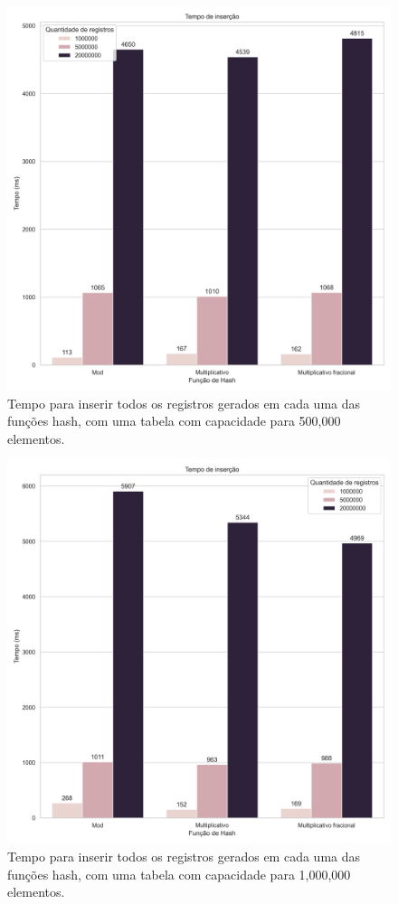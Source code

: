 \documentclass[12pt]{article}
\begin{document}
\newpage
\begin{figure}[ht]
\centering
\includegraphics[width=\textwidth,height=\textheight,keepaspectratio]{figures/insertion_runtime_500000.png}
\caption{Tempo para inserir todos os registros gerados em cada uma das funções hash, com uma tabela com capacidade para 500,000 elementos.}
\end{figure}

\newpage
\begin{figure}[ht]
\centering
\includegraphics[width=\textwidth,height=\textheight,keepaspectratio]{figures/insertion_runtime_1000000.png}
\caption{Tempo para inserir todos os registros gerados em cada uma das funções hash, com uma tabela com capacidade para 1,000,000 elementos.}
\end{figure}
\end{document}
